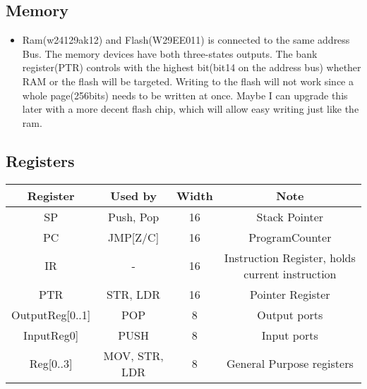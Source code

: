 \documentclass[a4paper, 12pt]{article}
\begin{document}
	\subsection{Memory}
	\begin{itemize}
		\item Ram(w24129ak12) and Flash(W29EE011) is connected to the same address Bus. The memory devices have both three-states outputs. The bank register(PTR) controls with the highest bit(bit14 on the address bus) whether RAM or the flash will be targeted. Writing to the flash will not work since a whole page(256bits) needs to be written at once. Maybe I can upgrade this later with a more decent flash chip, which will allow easy writing just like the ram.
	\end{itemize}

	\subsection {Registers}
	\small\begin{center}
		\begin{tabular}{|c|c|c|c|}
			\hline
			Register & Used by & Width & Note\\ \hline
			SP & Push, Pop & 16 & Stack Pointer\\ \hline
			PC & JMP[Z/C] & 16 & ProgramCounter\\ \hline
			IR & - & 16 & Instruction Register, holds current instruction\\ \hline
			PTR & STR, LDR & 16 & Pointer Register\\\hline
			OutputReg[0..1] & POP & 8 & Output ports\\ \hline
			InputReg0] & PUSH & 8 & Input ports\\ \hline
			Reg[0..3] & MOV, STR, LDR & 8 & General Purpose registers\\ \hline
		\end{tabular}
	\end{center}
	\newpage
\end{document}
